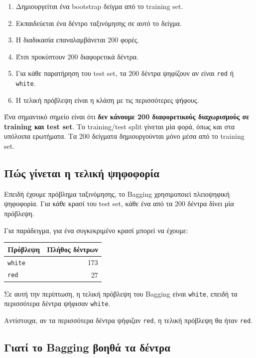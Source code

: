 \documentclass[12pt,a4paper]{article}
\newcommand{\code}[1]{\texttt{\textenglish{#1}}}
\begin{document}
\begin{enumerate}
    \item Δημιουργείται ένα bootstrap δείγμα από το training set.
    \item Εκπαιδεύεται ένα δέντρο ταξινόμησης σε αυτό το δείγμα.
    \item Η διαδικασία επαναλαμβάνεται 200 φορές.
    \item Έτσι προκύπτουν 200 διαφορετικά δέντρα.
    \item Για κάθε παρατήρηση του test set, τα 200 δέντρα ψηφίζουν αν είναι
    \code{red} ή \code{white}.
    \item Η τελική πρόβλεψη είναι η κλάση με τις περισσότερες ψήφους.
\end{enumerate}

Ένα σημαντικό σημείο είναι ότι \textbf{δεν κάνουμε 200 διαφορετικούς
διαχωρισμούς σε training και test set}. Το training/test split γίνεται μία
φορά, όπως και στα υπόλοιπα ερωτήματα. Τα 200 δείγματα δημιουργούνται μόνο
μέσα από το training set.

\subsection{Πώς γίνεται η τελική ψηφοφορία}

Επειδή έχουμε πρόβλημα ταξινόμησης, το Bagging χρησιμοποιεί πλειοψηφική
ψηφοφορία. Για κάθε κρασί του test set, κάθε ένα από τα 200 δέντρα δίνει μία
πρόβλεψη.

Για παράδειγμα, για ένα συγκεκριμένο κρασί μπορεί να έχουμε:

\begin{center}
\begin{tabular}{lr}
\toprule
\textbf{Πρόβλεψη} & \textbf{Πλήθος δέντρων} \\
\midrule
\code{white} & 173 \\
\code{red} & 27 \\
\bottomrule
\end{tabular}
\end{center}

Σε αυτή την περίπτωση, η τελική πρόβλεψη του Bagging είναι \code{white}, επειδή
τα περισσότερα δέντρα ψήφισαν \code{white}.

Αντίστοιχα, αν τα περισσότερα δέντρα ψήφιζαν \code{red}, η τελική πρόβλεψη θα
ήταν \code{red}.

\subsection{Γιατί το Bagging βοηθά τα δέντρα}
\end{document}
